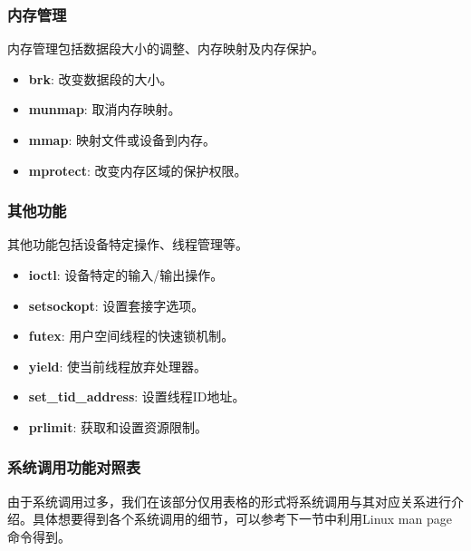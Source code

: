\subsubsection{内存管理}
内存管理包括数据段大小的调整、内存映射及内存保护。
\begin{itemize}
    \item \textbf{brk}: 改变数据段的大小。
    \item \textbf{munmap}: 取消内存映射。
    \item \textbf{mmap}: 映射文件或设备到内存。
    \item \textbf{mprotect}: 改变内存区域的保护权限。
\end{itemize}
\subsubsection{其他功能}
其他功能包括设备特定操作、线程管理等。
\begin{itemize}
    \item \textbf{ioctl}: 设备特定的输入/输出操作。
    \item \textbf{setsockopt}: 设置套接字选项。
    \item \textbf{futex}: 用户空间线程的快速锁机制。
    \item \textbf{yield}: 使当前线程放弃处理器。
    \item \textbf{set\_tid\_address}: 设置线程ID地址。
    \item \textbf{prlimit}: 获取和设置资源限制。
\end{itemize}
\subsubsection{系统调用功能对照表}
由于系统调用过多，我们在该部分仅用表格的形式将系统调用与其对应关系进行介绍。具体想要得到各个系统调用的细节，可以参考下一节中利用Linux man page命令得到。

